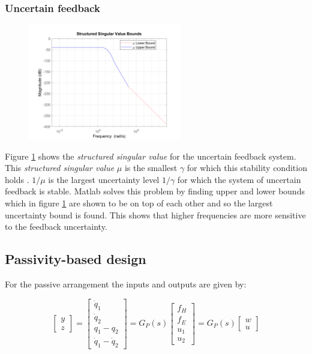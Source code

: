 \documentclass{article}
\begin{document}
\subsubsection{Uncertain feedback}

\begin{figure}[H]
    \centering
    \includegraphics[width=0.6\textwidth]{figures/structured_singular_values.png}
    \caption{}
    \label{fig:structured_singular_values}
\end{figure}

Figure \ref{fig:structured_singular_values} shows the \textit{structured singular value} for the uncertain feedback system.
This \textit{structured singular value} $\mu$ is the smallest $\gamma$ for which this stability condition holds \cite{matlab_robustmu}.
$1/\mu$ is the largest uncertainty level $1/\gamma$ for which the system of uncertain feedback is stable.
Matlab solves this problem by finding upper and lower bounds which in figure \ref{fig:structured_singular_values} are shown to be on top of each other and so the largest uncertainty bound is found.
This shows that higher frequencies are more sensitive to the feedback uncertainty.

\subsection{Passivity-based design}

For the passive arrangement the inputs and outputs are given by:

\begin{equation}
    \begin{bmatrix}
        y \\
        z
    \end{bmatrix} = \begin{bmatrix}
        \dot{q}_1 \\
        \dot{q}_2 \\
        q_1 - q_2 \\
        \dot{q}_1 - \dot{q}_2
    \end{bmatrix} = G_P(s) \begin{bmatrix}
        f_H \\
        f_E \\
        u_1 \\
        u_2
    \end{bmatrix} = G_P(s) \begin{bmatrix}
        w \\
        u
    \end{bmatrix}
\end{equation}
\end{document}
